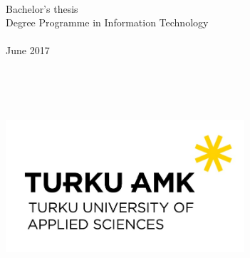 
\thispagestyle{empty}
\begingroup
\noindent
{}
\\
Bachelor's thesis
\\[0.5em]
Degree Programme in Information Technology
\\[0.5em]
\StudyGroup
\\[0.5em]
June 2017
\\[0.5em]
\endgroup 

\begingroup
\flushleft
{}
~
\\[5em]
\setlength{\leftskip}{2.25cm}\AuthorName
\\[0.35cm]
\sffamily\fontsize{24}{28.8}\selectfont
\MakeUppercase{\DocumentTitle}
\\[0.35cm]
\sffamily\fontsize{16}{19.2}\selectfont

\normalfont\large

\vfill
\centering
\includegraphics[height=4.93cm]
{Figure-TUAS}
\par
\endgroup

\clearpage


%
%


